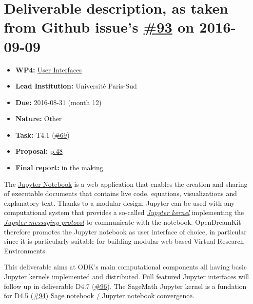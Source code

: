 \section*{\texorpdfstring{Deliverable description, as taken from Github
issue's
\href{https://github.com/OpenDreamKit/OpenDreamKit/issues/93}{\#93} on
2016-09-09}{Deliverable description, as taken from Github issue's \#93 on 2016-09-09}}\label{deliverable-description-as-taken-from-github-issues-93-on-2016-09-09}

\begin{itemize}
\tightlist
\item
  \textbf{WP4:}
  \href{https://github.com/OpenDreamKit/OpenDreamKit/tree/master/WP4}{User
  Interfaces}
\item
  \textbf{Lead Institution:} Université Paris-Sud
\item
  \textbf{Due:} 2016-08-31 (month 12)
\item
  \textbf{Nature:} Other
\item
  \textbf{Task:} T4.1
  (\href{https://github.com/OpenDreamKit/OpenDreamKit/issues/69}{\#69})
\item
  \textbf{Proposal:}
  \href{https://github.com/OpenDreamKit/OpenDreamKit/raw/master/Proposal/proposal-www.pdf}{p.48}
\item
  \textbf{Final report:} in the making
\end{itemize}

The \href{https://jupyter.org}{Jupyter Notebook} is a web application
that enables the creation and sharing of executable documents that
contains live code, equations, visualizations and explanatory text.
Thanks to a modular design, Jupyter can be used with any computational
system that provides a so-called
\href{https://jupyter.readthedocs.io/en/latest/projects/kernels.html}{\emph{Jupyter
kernel}} implementing the
\href{https://jupyter-client.readthedocs.io/en/latest/}{\emph{Jupyter
messaging protocol}} to communicate with the notebook. OpenDreamKit
therefore promotes the Jupyter notebook as user interface of choice, in
particular since it is particularly suitable for building modular web
based Virtual Research Environments.

This deliverable aims at ODK's main computational components all having
basic Jupyter kernels implemented and distributed. Full featured Jupyter
interfaces will follow up in deliverable D4.7
(\href{https://github.com/OpenDreamKit/OpenDreamKit/issues/96}{\#96}).
The SageMath Jupyter kernel is a fundation for D4.5
(\href{https://github.com/OpenDreamKit/OpenDreamKit/issues/94}{\#94})
Sage notebook / Jupyter notebook convergence.

